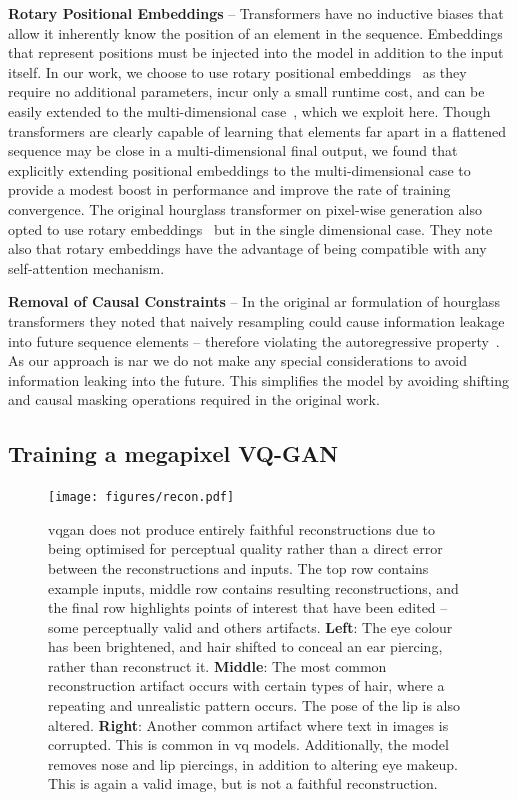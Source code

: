\textbf{Rotary Positional Embeddings} -- Transformers have no inductive biases
that allow it inherently know the position of an element in the sequence.
Embeddings that represent positions must be injected into the model in addition
to the input itself. In our work, we choose to use rotary positional
embeddings~\cite{su2021roformer} as they require no additional parameters, incur
only a small runtime cost, and can be easily extended to the multi-dimensional
case~\cite{rope-eleutherai}, which we exploit here. Though transformers are
clearly capable of learning that elements far apart in a flattened sequence may
be close in a multi-dimensional final output, we found that explicitly extending
positional embeddings to the multi-dimensional case to provide a modest boost in
performance and improve the rate of training convergence. The original hourglass
transformer on pixel-wise generation also opted to use rotary
embeddings~\cite{nawrot2021hierarchical} but in the single dimensional case.
They note also that rotary embeddings have the advantage of being compatible
with any self-attention mechanism.

\textbf{Removal of Causal Constraints} -- In the original \gls{ar}
formulation of hourglass transformers they noted that naively resampling could
cause information leakage into future sequence elements -- therefore violating
the autoregressive property~\cite{nawrot2021hierarchical}. As our approach is
\gls{nar} we do not make any special considerations to avoid information leaking
into the future. This simplifies the model by avoiding shifting and causal
masking operations required in the original work.

\subsection{Training a megapixel VQ-GAN}
\label{subsec:megagan}

\begin{figure}[ht]
    \centering
    \texttt{[image: figures/recon.pdf]}
    \caption{
        \gls{vqgan} does not produce entirely faithful reconstructions due to
        being optimised for perceptual quality rather than a direct error between
        the reconstructions and inputs. The top row contains example inputs, middle row
        contains resulting reconstructions, and the final row highlights points of interest that
        have been edited -- some perceptually valid and others 
        artifacts. 
        \textbf{Left}: The eye colour has been brightened, and hair
        shifted to conceal an ear piercing, rather than reconstruct it.
        \textbf{Middle}: The most common reconstruction artifact occurs with
        certain types of hair, where a repeating and unrealistic pattern occurs. The
        pose of the lip is also altered. 
        \textbf{Right}: Another common artifact where text in images is
        corrupted. This is common in \gls{vq} models. Additionally,
        the model removes nose and lip piercings, in addition to altering eye
        makeup. This is again a valid image, but is not a faithful
        reconstruction.}
    \label{fig:recon}
\end{figure}

